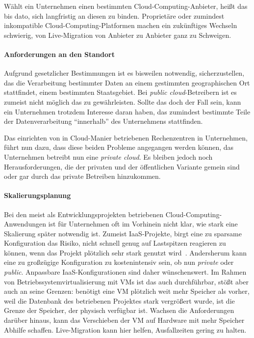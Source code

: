 Wählt ein Unternehmen einen bestimmten Cloud-Computing-Anbieter, heißt
das bis dato, sich langfristig an diesen zu binden. Proprietäre oder
zumindest inkompatible Cloud-Computing-Platformen machen ein
zukünftiges Wechseln schwierig, von Live-Migration von Anbieter zu
Anbieter ganz zu Schweigen. 

\paragraph*{Anforderungen an den Standort}
\label{sec:anforderungen-an-den}

Aufgrund gesetzlicher Bestimmungen ist es bisweilen notwendig,
sicherzustellen, das die Verarbeitung bestimmter Daten an einem
gestimmten geographischen Ort stattfindet, \zB einem bestimmten
Staatsgebiet. Bei \emph{public cloud}-Betreibern ist es zumeist nicht
möglich das zu gewährleisten. Sollte das doch der Fall sein, kann ein
Unternehmen trotzdem Interesse daran haben, das zumindest bestimmte
Teile der Datenverarbeitung "`innerhalb"' des Unternehmens
stattfinden.

\medskip

Das einrichten von in Cloud-Manier betriebenen Rechenzentren in
Unternehmen, führt nun dazu, dass diese beiden Probleme angegangen
werden können, das Unternehmen betreibt nun eine \emph{private cloud}.
Es bleiben jedoch noch Herausforderungen, die der privaten und der
öffentlichen Variante gemein sind oder gar durch das private Betreiben
hinzukommen.~\cite{Schwarzer2010:Cloud-Hype-Tren}

\paragraph*{Skalierungsplanung}
\label{sec:skalierungsplanung}

Bei den meist als Entwicklungsprojekten betriebenen
Cloud-Computing-Anwendungen ist für Unternehmen oft im Vorhinein nicht
klar, wie stark eine Skalierung später notwendig ist. Zumeist
\ac{IaaS}-Projekte, birgt eine zu sparsame Konfiguration das Risiko,
nicht schnell genug auf Lastspitzen reagieren zu können, wenn das
Projekt plötzlich sehr stark genutzt
wird~\cite{flightcaster_success}. Andersherum kann eine zu großzügige
Konfiguration zu kostenintensiv sein, ob nun \emph{private} oder
\emph{public}. Anpassbare \ac{IaaS}-Konfigurationen sind daher
wünschenswert. Im Rahmen von Betriebssystemvirtualisierung mit
\acfp{VM} ist das auch durchführbar, stößt aber auch an seine Grenzen:
benötigt eine \ac{VM} plötzlich weit mehr Speicher als vorher, weil
\zB die Datenbank des betriebenen Projektes stark vergrößert wurde,
ist die Grenze der Speicher, der physisch verfügbar ist. Wachsen die
Anforderungen darüber hinaus, kann das Verschieben der \ac{VM} auf
Hardware mit mehr Speicher Abhilfe schaffen. Live-Migration kann hier
helfen, Ausfallzeiten gering zu halten.

